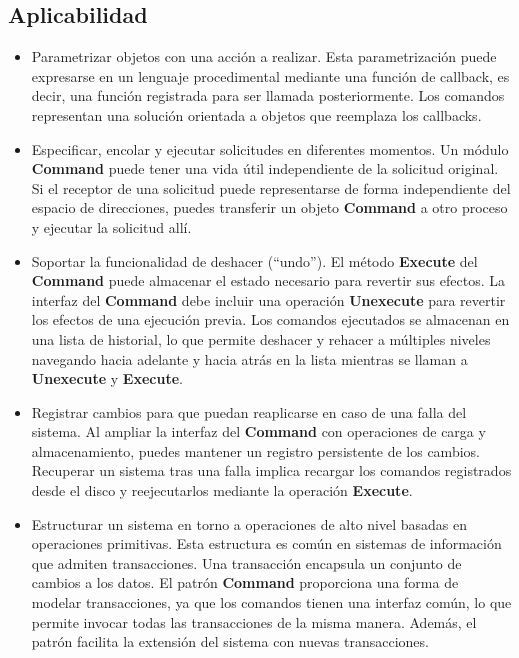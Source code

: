 \subsection*{Aplicabilidad}

\begin{itemize}
\item Parametrizar objetos con una acción a realizar. Esta parametrización puede expresarse en un lenguaje procedimental mediante una función de \gls{callback}, es decir, una función registrada para ser llamada posteriormente. Los comandos representan una solución orientada a objetos que reemplaza los \glspl{callback}.

\item Especificar, encolar y ejecutar solicitudes en diferentes momentos. Un módulo \textbf{Command} puede tener una vida útil independiente de la solicitud original. Si el receptor de una solicitud puede representarse de forma independiente del espacio de direcciones, puedes transferir un objeto \textbf{Command} a otro proceso y ejecutar la solicitud allí.

\item Soportar la funcionalidad de deshacer (``undo''). El método \textbf{Execute} del \textbf{Command} puede almacenar el estado necesario para revertir sus efectos. La interfaz del \textbf{Command} debe incluir una operación \textbf{Unexecute} para revertir los efectos de una ejecución previa. Los comandos ejecutados se almacenan en una lista de historial, lo que permite deshacer y rehacer a múltiples niveles navegando hacia adelante y hacia atrás en la lista mientras se llaman a \textbf{Unexecute} y \textbf{Execute}.

\item Registrar cambios para que puedan reaplicarse en caso de una falla del sistema. Al ampliar la interfaz del \textbf{Command} con operaciones de carga y almacenamiento, puedes mantener un registro persistente de los cambios. Recuperar un sistema tras una falla implica recargar los comandos registrados desde el disco y reejecutarlos mediante la operación \textbf{Execute}.

\item Estructurar un sistema en torno a operaciones de alto nivel basadas en operaciones primitivas. Esta estructura es común en sistemas de información que admiten transacciones. Una transacción encapsula un conjunto de cambios a los datos. El patrón \textbf{Command} proporciona una forma de modelar transacciones, ya que los comandos tienen una interfaz común, lo que permite invocar todas las transacciones de la misma manera. Además, el patrón facilita la extensión del sistema con nuevas transacciones.
\end{itemize}


